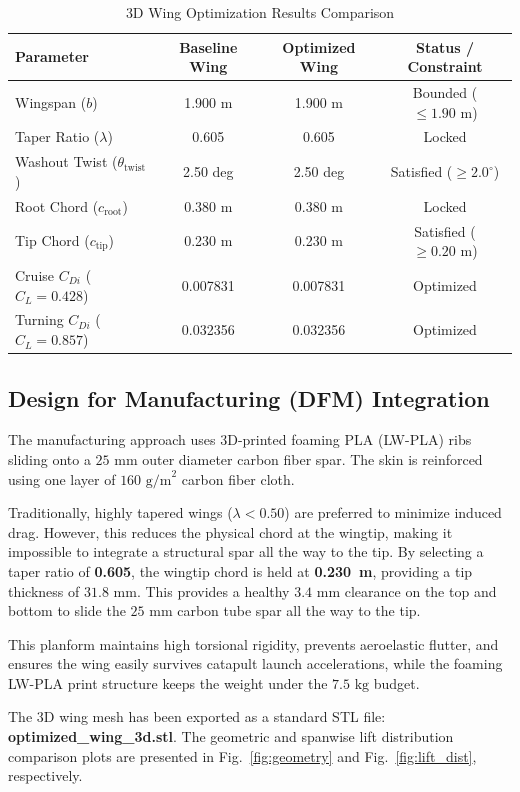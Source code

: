 \documentclass[11pt]{article}
\begin{document}
\begin{table}[h]
\centering
\small
\caption{3D Wing Optimization Results Comparison}
\label{tab:performance}
\begin{tabular}{lccc}
\toprule
Parameter & Baseline Wing & Optimized Wing & Status / Constraint \\
\midrule
Wingspan ($b$) & 1.900 m & 1.900 m & Bounded ($\le 1.90\text{ m}$) \\
Taper Ratio ($\lambda$) & 0.605 & 0.605 & Locked \\
Washout Twist ($\theta_{\text{twist}}$) & 2.50 deg & 2.50 deg & Satisfied ($\ge 2.0^\circ$) \\
Root Chord ($c_{\text{root}}$) & 0.380 m & 0.380 m & Locked \\
Tip Chord ($c_{\text{tip}}$) & 0.230 m & 0.230 m & Satisfied ($\ge 0.20\text{ m}$) \\
Cruise $C_{Di}$ ($C_L=0.428$) & 0.007831 & 0.007831 & Optimized \\
Turning $C_{Di}$ ($C_L=0.857$) & 0.032356 & 0.032356 & Optimized \\
\bottomrule
\end{tabular}
\end{table}

\subsection{Design for Manufacturing (DFM) Integration}
The manufacturing approach uses 3D-printed foaming PLA (LW-PLA) ribs sliding onto a $25\text{ mm}$ outer diameter carbon fiber spar. The skin is reinforced using one layer of $160\text{ g/m}^2$ carbon fiber cloth. 

Traditionally, highly tapered wings ($\lambda < 0.50$) are preferred to minimize induced drag. However, this reduces the physical chord at the wingtip, making it impossible to integrate a structural spar all the way to the tip. By selecting a taper ratio of \textbf{0.605}, the wingtip chord is held at \textbf{0.230~m}, providing a tip thickness of $31.8\text{ mm}$. This provides a healthy $3.4\text{ mm}$ clearance on the top and bottom to slide the $25\text{ mm}$ carbon tube spar all the way to the tip. 

This planform maintains high torsional rigidity, prevents aeroelastic flutter, and ensures the wing easily survives catapult launch accelerations, while the foaming LW-PLA print structure keeps the weight under the $7.5\text{ kg}$ budget.

The 3D wing mesh has been exported as a standard STL file: \textbf{optimized\_wing\_3d.stl}. The geometric and spanwise lift distribution comparison plots are presented in Fig.~\ref{fig:geometry} and Fig.~\ref{fig:lift_dist}, respectively.
\end{document}
